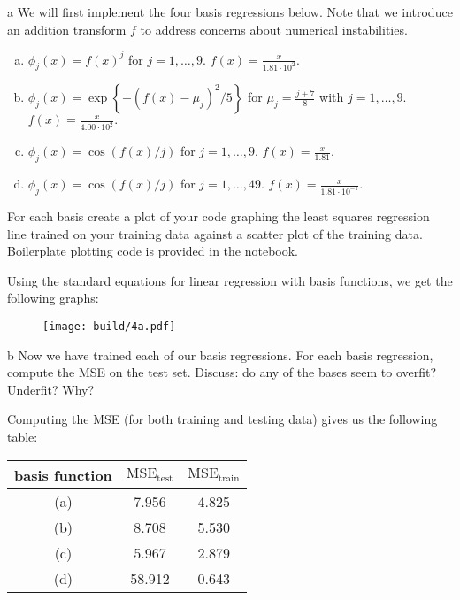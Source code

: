 \documentclass[expanded]{lkx_pset}
\begin{document}
\begin{parts}
	\begin{part}{a}
		We will first implement the four basis regressions below. Note that we introduce an addition transform $f$ to address concerns about numerical instabilities.
		\begin{enumerate}[(a)]
			\item $\phi_j(x)= f(x)^j$ for $j=1,\ldots, 9$. $f(x) = \frac{x}{1.81 \cdot 10^{2}}.$
			\item $\phi_j(x) = \exp\left\{-(f(x)-\mu_j)^2/5\right\}$ for $\mu_j=\frac{j + 7}{8}$ with $j=1,\ldots, 9$. $f(x) = \frac{x}{4.00 \cdot 10^{2}}.$
			\item $\phi_j(x) =  \cos(f(x) / j)$ for $j=1, \ldots, 9$. $f(x) = \frac{x}{1.81}$.
			\item $\phi_j(x) = \cos(f(x) / j)$ for $j=1, \ldots, 49$. $f(x) = \frac{x}{1.81 \cdot 10^{-1}}$.
		\end{enumerate}

		For each basis create a plot of your code graphing the least squares regression line trained on your training data against a scatter plot of the training data. Boilerplate plotting code is provided in the notebook.
	\end{part}

	Using the standard equations for linear regression with basis functions, we get the following graphs:
	\begin{figure}[ht]
		\centering
		\texttt{[image: build/4a.pdf]}
	\end{figure}\noindent

	\begin{part}{b}
		Now we have trained each of our basis regressions.  For each basis
		regression, compute the MSE on the test set.  Discuss: do any of the
		bases seem to overfit?  Underfit?  Why?
	\end{part}
	Computing the MSE (for both training and testing data) gives us the following table:

	\begin{center}
		\renewcommand*{\arraystretch}{1.2}
		\begin{tabular}{|c|c|c|}
			\hline
			basis function & $\textrm{MSE}_\textrm{test}$ & $\textrm{MSE}_\textrm{train}$ \\
			\hline
			(a)            & 7.956                        & 4.825                         \\
			(b)            & 8.708                        & 5.530                         \\
			(c)            & 5.967                        & 2.879                         \\
			(d)            & 58.912                       & 0.643                         \\
			\hline
		\end{tabular}
	\end{center}


\end{parts}
\end{document}
